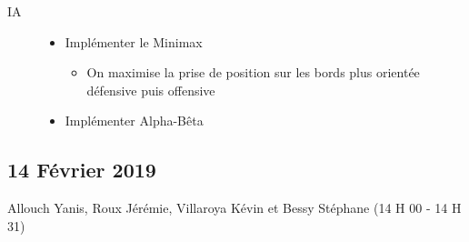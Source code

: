 \documentclass[11pt,a4paper]{article}
\begin{document}
\begin{description}
    \item[IA] \begin{itemize}
        \item Implémenter le Minimax
            \begin{itemize}[label=\textbullet]
                \item On maximise la prise de position sur les bords plus orientée défensive puis offensive
            \end{itemize}
        \item Implémenter Alpha-Bêta
    \end{itemize}
\end{description}

\newpage
\subsection{14 Février 2019}
Allouch Yanis, Roux Jérémie, Villaroya Kévin et Bessy Stéphane (14 H 00 - 14 H 31)\\
\end{document}

